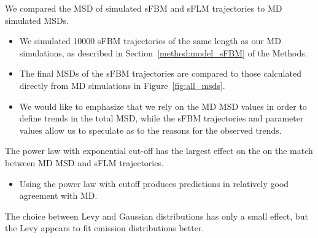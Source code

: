 \documentclass{article}
\begin{document}
  \noindent We compared the MSD of simulated sFBM and sFLM trajectories to MD simulated
  MSDs.
  \begin{itemize}
	\item We simulated 10000 sFBM trajectories of the same length as our MD
	simulations, as described in Section~\ref{method:model_sFBM} of the Methods.
	\item The final MSDs of the sFBM trajectories are compared to those 
	calculated directly from MD simulations in Figure~\ref{fig:all_msds}. 
	\item We would like to emphasize that we rely on the MD MSD values in order to
	define trends in the total MSD, while the sFBM trajectories and parameter 
	values allow us to speculate as to the reasons for the observed trends. 
  \end{itemize}
  
  
  \noindent The power law with exponential cut-off has the largest effect on the on 
  the match between MD MSD and sFLM trajectories.
  \begin{itemize}
    \item Using the power law with cutoff produces predictions in relatively good agreement
    with MD.
  \end{itemize}
  
  \noindent The choice between Levy and Gaussian distributions has only a small effect, 
  but the Levy appears to fit emission distributions better. \\
\end{document}
